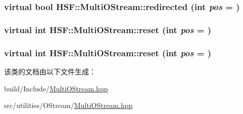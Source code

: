 \label{classHSF_1_1MultiOStream_a4f08ea78abbcd60f0d6460cdce6ea79d}
\hypertarget{classHSF_1_1MultiOStream_a4f08ea78abbcd60f0d6460cdce6ea79d}{
\subsubsection[{redirected}]{\setlength{\rightskip}{0pt plus 5cm}virtual bool HSF::MultiOStream::redirected (int {\em pos} = {})}}
\label{classHSF_1_1MultiOStream_a4f08ea78abbcd60f0d6460cdce6ea79d}
\hypertarget{classHSF_1_1MultiOStream_aa9292b98a3ef97388d1aa6ce8119412f}{
\subsubsection[{reset}]{\setlength{\rightskip}{0pt plus 5cm}virtual int HSF::MultiOStream::reset (int {\em pos} = {})}}
\label{classHSF_1_1MultiOStream_aa9292b98a3ef97388d1aa6ce8119412f}
\hypertarget{classHSF_1_1MultiOStream_aa9292b98a3ef97388d1aa6ce8119412f}{
\subsubsection[{reset}]{\setlength{\rightskip}{0pt plus 5cm}virtual int HSF::MultiOStream::reset (int {\em pos} = {})}}
\label{classHSF_1_1MultiOStream_aa9292b98a3ef97388d1aa6ce8119412f}


该类的文档由以下文件生成：\begin{DoxyCompactItemize}
\item 
build/Include/\hyperlink{build_2Include_2MultiOStream_8hpp}{MultiOStream.hpp}\item 
src/utilities/OStream/\hyperlink{src_2utilities_2OStream_2MultiOStream_8hpp}{MultiOStream.hpp}\end{DoxyCompactItemize}
